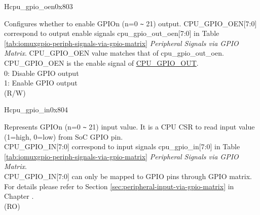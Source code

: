 \begin{register}{H}{cpu\_gpio\_oen}{0x803}\label{regdesc:GPIO_OEN}
%
%
%
%
%
%
%
%
%
\regnewline%
\begin{regdesc}\begin{reglist}
\label{fielddesc:GPIO_OEN}\item [CPU\_GPIO\_OEN] Configures whether to enable GPIOn (n=0 \verb+~+ 21) output. CPU\_GPIO\_OEN[7:0] correspond to output enable signals cpu\_gpio\_out\_oen[7:0] in Table \ref{tab:iomuxgpio-periph-signals-via-gpio-matrix} \textit{Peripheral Signals via GPIO Matrix}. CPU\_GPIO\_OEN value matches that of cpu\_gpio\_out\_oen.
CPU\_GPIO\_OEN is the enable signal of \hyperref[fielddesc:GPIO_OUT]{CPU\_GPIO\_OUT}.\\ 
0: Disable GPIO output\\
1: Enable GPIO output\\
(R/W)
\end{reglist}\end{regdesc}
\end{register}

\begin{register}{H}{cpu\_gpio\_in}{0x804}\label{regdesc:GPIO_IN}
%
%
%
%
%
%
%
%
%
\regnewline%
\begin{regdesc}\begin{reglist}
\label{fielddesc:GPIO_IN}\item [CPU\_GPIO\_IN] Represents GPIOn (n=0 \verb+~+ 21) input value. It is a CPU CSR to read input value (1=high, 0=low) from SoC GPIO pin.\\
CPU\_GPIO\_IN[7:0] correspond to input signals cpu\_gpio\_in[7:0] in Table \ref{tab:iomuxgpio-periph-signals-via-gpio-matrix} \textit{Peripheral Signals via GPIO Matrix}.\\
CPU\_GPIO\_IN[7:0] can only be mapped to GPIO pins through GPIO matrix. For details please refer to Section \ref{sec:peripheral-input-via-gpio-matrix} in Chapter \textit{}.\\
(RO) 
\end{reglist}\end{regdesc}
\end{register}

